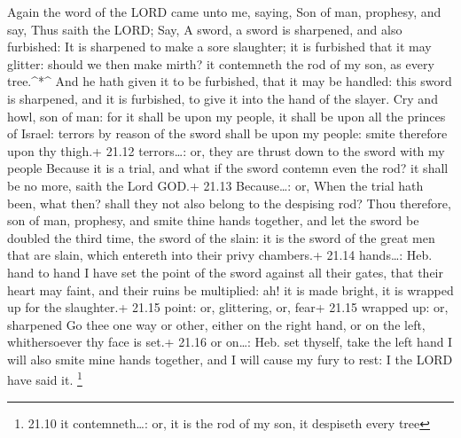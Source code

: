  Again the word of the LORD came unto me, saying,
 Son of man, prophesy, and say, Thus saith the LORD; Say, A
sword, a sword is sharpened, and also furbished:  It is
sharpened to make a sore slaughter; it is furbished that it may glitter:
should we then make mirth? it contemneth the rod of my son, as every
tree.\^{}*\^{}  And he hath given it to be furbished, that
it may be handled: this sword is sharpened, and it is furbished, to give
it into the hand of the slayer.  Cry and howl, son of man:
for it shall be upon my people, it shall be upon all the princes of
Israel: terrors by reason of the sword shall be upon my people: smite
therefore upon thy thigh.+ 21.12 terrors\ldots: or, they are thrust down
to the sword with my people  Because it is a trial, and
what if the sword contemn even the rod? it shall be no more, saith the
Lord GOD.+ 21.13 Because\ldots: or, When the trial hath been, what then?
shall they not also belong to the despising rod?  Thou
therefore, son of man, prophesy, and smite thine hands together, and let
the sword be doubled the third time, the sword of the slain: it is the
sword of the great men that are slain, which entereth into their privy
chambers.+ 21.14 hands\ldots: Heb. hand to hand  I have set
the point of the sword against all their gates, that their heart may
faint, and their ruins be multiplied: ah! it is made bright, it is
wrapped up for the slaughter.+ 21.15 point: or, glittering, or, fear+
21.15 wrapped up: or, sharpened  Go thee one way or other,
either on the right hand, or on the left, whithersoever thy face is
set.+ 21.16 or on\ldots: Heb. set thyself, take the left hand
 I will also smite mine hands together, and I will cause my
fury to rest: I the LORD have said it. \footnote{21.10 it
  contemneth\ldots: or, it is the rod of my son, it despiseth every tree}

